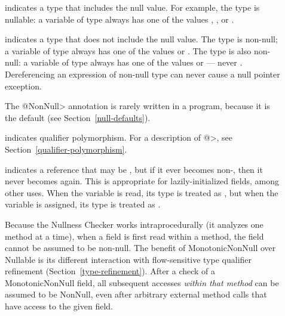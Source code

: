 \begin{description}

\item[]
  indicates a type that includes the null value.  For example, the type 
  is nullable:  a variable of type  always has one of the
  values , , or .

\item[]
  indicates a type that does not include the null value.  The type
   is non-null; a variable of type  always has
  one of the values  or .  The type  is also non-null:  a variable of type 
  always has one of the values  or  --- never
  .  Dereferencing an expression of non-null type can never cause
  a null pointer exception.

  The \<@NonNull> annotation is rarely written in a program, because it is
  the default (see Section~\ref{null-defaults}).

\item[]
  indicates qualifier polymorphism.  For a description of
  \<@>, see
  Section~\ref{qualifier-polymorphism}.

\item[]
  indicates a reference that may be , but if it ever becomes
  non-, then it never becomes  again.  This is
  appropriate for lazily-initialized fields, among other uses.  When the
  variable is read, its type is treated as
  , but when the variable is
  assigned, its type is treated as
  .

  Because the Nullness Checker works intraprocedurally (it analyzes one
  method at a time), when a  field is first read within a
  method, the field cannot be assumed to be non-null.  The benefit of
  MonotonicNonNull over Nullable is its different interaction with
  flow-sensitive type qualifier refinement (Section~\ref{type-refinement}).
  After a check of a MonotonicNonNull
  field, all subsequent accesses \emph{within that method} can be assumed
  to be NonNull, even after arbitrary external method calls that have
  access to the given field.

\end{description}

